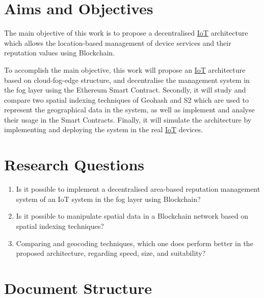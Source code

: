 \section{Aims and Objectives} \label{Introduction-Aims}

\npara The main objective of this work is to propose a decentralised \hyperref[Acronym-IoT]{IoT} architecture which allows the location-based management of device services and their reputation values using Blockchain.

\npara To accomplish the main objective, this work will propose an \hyperref[Acronym-IoT]{IoT} architecture based on cloud-fog-edge structure, and decentralise the management system in the fog layer using the Ethereum Smart Contract.
Secondly, it will study and compare two spatial indexing techniques of Geohash and S2 which are used to represent the geographical data in the system, as well as implement and analyse their usage in the Smart Contracts.
Finally, it will simulate the architecture by implementing and deploying the system in the real \hyperref[Acronym-IoT]{IoT} devices.

\section{Research Questions} \label{Introduction-ResearchQuestions}

\begin{enumerate}
  \item \label{ResearchQuestion-DecentralisedFog} Is it possible to implement a decentralised area-based reputation management system of an IoT system in the fog layer using Blockchain?
  \item \label{ResearchQuestion-SpatialBlockchain} Is it possible to manipulate spatial data in a Blockchain network based on spatial indexing techniques?
  \item \label{ResearchQuestion-Geocoding} Comparing  and  geocoding techniques, which one does perform better in the proposed architecture, regarding speed, size, and suitability?
\end{enumerate}

\section{Document Structure} \label{Introduction-Structure}

